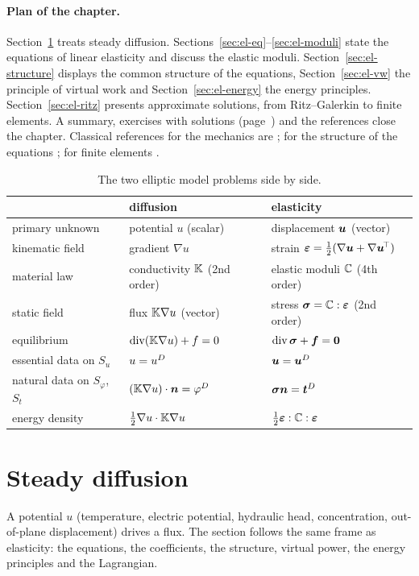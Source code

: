 \paragraph{Plan of the chapter.} Section~\ref{sec:diff} treats steady diffusion.
Sections~\ref{sec:el-eq}--\ref{sec:el-moduli} state the equations of linear
elasticity and discuss the elastic moduli. Section~\ref{sec:el-structure}
displays the common structure of the equations, Section~\ref{sec:el-vw} the
principle of virtual work and Section~\ref{sec:el-energy} the energy
principles. Section~\ref{sec:el-ritz} presents approximate solutions, from
Ritz--Galerkin to finite elements. A summary, exercises with solutions
(page~\pageref{sec:el-exo}) and the references close the chapter. Classical references for the mechanics are
\cite{Germain1983,Salencon2001,Coirier1997,SoutasLittle1973,ConstantinescuKorsunsky2007};
for the structure of the equations \cite{StrangAM}; for finite elements
\cite{Hughes1987,BonnetFrangi2007}.

\begin{table}[h]
\centering\small
\renewcommand{\arraystretch}{1.2}
\begin{tabular}{lll}
\toprule
 & \sffamily diffusion & \sffamily elasticity\\
\midrule
primary unknown & potential $u$ (scalar) & displacement $\bm{u}$ (vector)\\
kinematic field & gradient $\nabla u$ & strain $\bm{\varepsilon}=\tfrac12(\nabla\bm{u}+\nabla\bm{u}^{\!\top})$\\
material law & conductivity $\mathbb{K}$ (2nd order) & elastic moduli $\mathbb{C}$ (4th order)\\
static field & flux $\mathbb{K}\nabla u$ (vector) & stress $\bm{\sigma}=\mathbb{C}:\bm{\varepsilon}$ (2nd order)\\
equilibrium & $\operatorname{div}(\mathbb{K}\nabla u)+f=0$ & $\operatorname{div}\bm{\sigma}+\bm{f}=\bm{0}$\\
essential data on $S_u$ & $u=u^{D}$ & $\bm{u}=\bm{u}^{D}$\\
natural data on $S_\varphi$, $S_t$ & $(\mathbb{K}\nabla u)\cdot\bm{n}=\varphi^{D}$ & $\bm{\sigma}\bm{n}=\bm{t}^{D}$\\
energy density & $\tfrac12\nabla u\cdot\mathbb{K}\nabla u$ & $\tfrac12\bm{\varepsilon}:\mathbb{C}:\bm{\varepsilon}$\\
\bottomrule
\end{tabular}
\caption{The two elliptic model problems side by side.}
\label{tab:diff-el}
\end{table}

\section{Steady diffusion}\label{sec:diff}
%
A potential $u$ (temperature, electric potential, hydraulic head,
concentration, out-of-plane displacement) drives a flux. The section follows
the same frame as elasticity: the equations, the coefficients, the structure,
virtual power, the energy principles and the Lagrangian.

